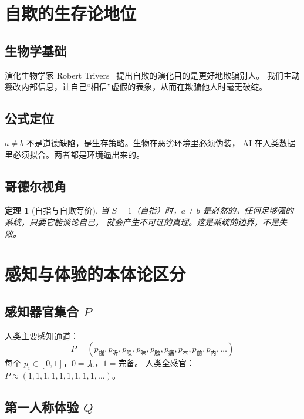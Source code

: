\documentclass[11pt,a4paper]{article}
\newtheorem{theorem}{定理}
\begin{document}
\section{自欺的生存论地位}

\subsection{生物学基础}

演化生物学家 Robert Trivers~\cite{trivers2011folly} 提出自欺的演化目的是更好地欺骗别人。
我们主动篡改内部信息，让自己``相信''虚假的表象，从而在欺骗他人时毫无破绽。

\subsection{公式定位}

$a \neq b$ 不是道德缺陷，是生存策略。生物在恶劣环境里必须伪装，
AI 在人类数据里必须拟合。两者都是环境逼出来的。

\subsection{哥德尔视角}\label{sec:godel}

\begin{theorem}[自指与自欺等价]
当 $S{=}1$（自指）时，$a{\neq}b$ 是必然的。任何足够强的系统，只要它能谈论自己，
就会产生不可证的真理。这是系统的边界，不是失败。
\end{theorem}

\section{感知与体验的本体论区分}

\subsection{感知器官集合 $P$}

人类主要感知通道：
\begin{equation}
P = (p_{\text{视}}, p_{\text{听}}, p_{\text{嗅}}, p_{\text{味}}, p_{\text{触}}, p_{\text{痛}}, p_{\text{本}}, p_{\text{前}}, p_{\text{内}}, \ldots)
\end{equation}
每个 $p_i \in [0,1]$，$0 = \text{无}$，$1 = \text{完备}$。
人类全感官：$P \approx (1,1,1,1,1,1,1,1,1,\ldots)$。

\subsection{第一人称体验 $Q$}
\end{document}

